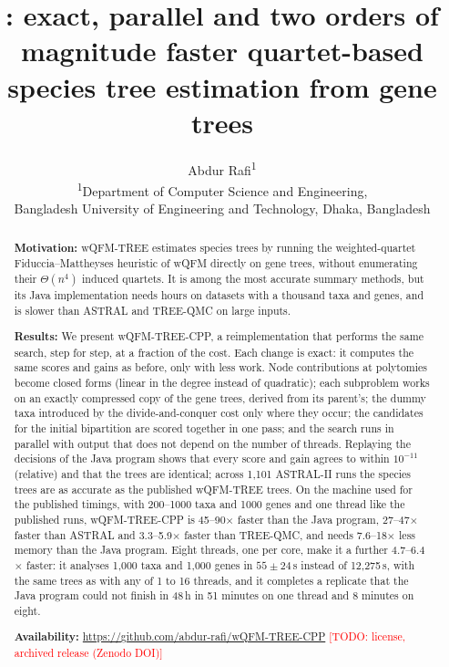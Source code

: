 \documentclass[11pt,a4paper]{article}
\title{\cpp: exact, parallel and two orders of magnitude faster quartet-based species tree estimation from gene trees}
\author{Abdur Rafi\textsuperscript{1}\\[2pt]
\small\textsuperscript{1}Department of Computer Science and Engineering,\\
\small Bangladesh University of Engineering and Technology, Dhaka, Bangladesh\\[2pt]
\small\todo{co-authors, affiliations, corresponding author}}
\date{\todo{date}}
\newcommand{\todo}[1]{\textcolor{red}{[TODO: #1]}}
\newcommand{\wqfmtree}{wQFM-TREE}
\newcommand{\cpp}{wQFM-TREE-CPP}
\begin{document}
\maketitle

\begin{abstract}
\noindent\textbf{Motivation:} \wqfmtree{} estimates species trees by running the weighted-quartet
Fiduccia--Mattheyses heuristic of wQFM directly on gene trees, without enumerating their
$\Theta(n^4)$ induced quartets. It is among the most accurate summary methods, but its Java
implementation needs hours on datasets with a thousand taxa and genes, and is slower than
ASTRAL and TREE-QMC on large inputs.

\noindent\textbf{Results:} We present \cpp, a reimplementation that performs the same search,
step for step, at a fraction of the cost. Each change is exact: it computes the same scores and gains
as before, only with less work. Node contributions at polytomies become closed forms (linear in the
degree instead of quadratic); each subproblem works on an exactly compressed copy of the gene trees,
derived from its parent's; the dummy taxa introduced by the divide-and-conquer cost only where they
occur; the candidates for the initial bipartition are scored together in one pass; and the search
runs in parallel with output that does not depend on the number of threads. Replaying the
decisions of the Java program shows that every score and gain agrees to within $10^{-11}$ (relative)
and that the trees are identical; across 1{,}101 ASTRAL-II runs the species trees are as accurate as
the published \wqfmtree{} trees. On the machine used for the published timings, with 200--1000 taxa
and 1000 genes and one thread like the published runs, \cpp{} is 45--90$\times$ faster than the Java
program, 27--47$\times$ faster than ASTRAL and 3.3--5.9$\times$ faster than TREE-QMC, and needs
7.6--18$\times$ less memory than the Java program. Eight threads, one per core, make it a further
4.7--6.4$\times$ faster: it analyses 1{,}000 taxa and 1{,}000 genes in $55\pm24$\,s instead of
12{,}275\,s, with the same trees as with any of 1 to 16 threads, and it
completes a replicate that the Java program could not finish in 48\,h in 51 minutes on one thread and
8 minutes on eight.

\noindent\textbf{Availability:} \url{https://github.com/abdur-rafi/wQFM-TREE-CPP}
\todo{license, archived release (Zenodo DOI)}
\end{abstract}

\end{document}
